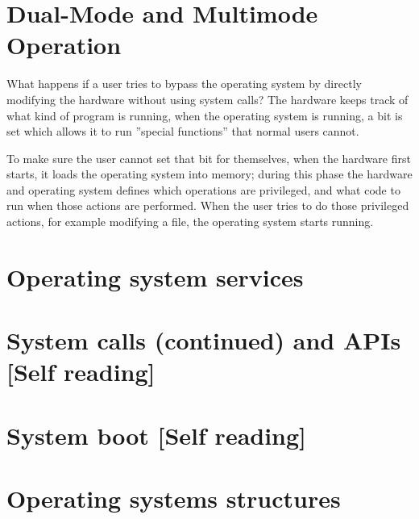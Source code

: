 \section{Dual-Mode and Multimode Operation}
What happens if a user tries to bypass the operating system by directly modifying the hardware without using system calls? The hardware keeps track of what kind of program is running, when the operating system is running, a bit is set which allows it to run ''special functions'' that normal users cannot.

To make sure the user cannot set that bit for themselves, when the hardware first starts, it loads the operating system into memory; during this phase the hardware and operating system defines which operations are privileged, and what code to run when those actions are performed. When the user tries to do those privileged actions, for example modifying a file, the operating system starts running.
\section{Operating system services}
\section{System calls (continued) and APIs [Self reading]}
\section{System boot [Self reading]}
\section{Operating systems structures}
